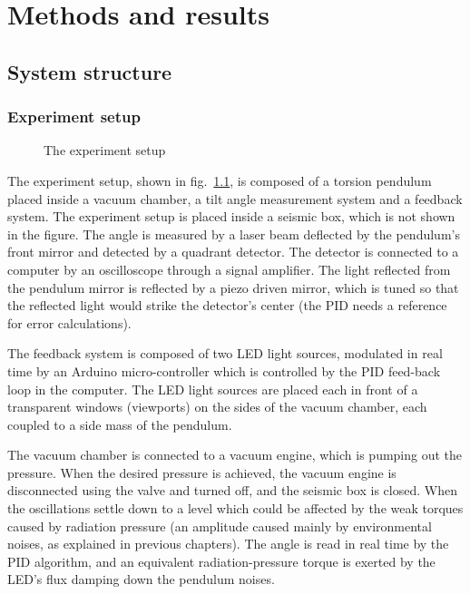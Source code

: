 \documentclass[\main/master.tex]{subfiles}
\begin{document}
\chapter{Methods and results}\label{chapter:Methods and results}

\section{System structure}
\subsection{Experiment setup}
\begin{figure}[htbp]
	\centering
	\caption[The experiment setup]{The experiment setup}
	\label{fig:setup}
\end{figure}
\FloatBarrier
\par\noindent
The experiment setup, shown in fig.~\ref{fig:setup}, is composed of a torsion pendulum placed inside a vacuum chamber, a tilt angle measurement system and a feedback system. The experiment setup is placed inside a seismic box, which is not shown in the figure. The angle is measured by a laser beam deflected by the pendulum's front mirror and detected by a quadrant detector. The detector is connected to a computer by an oscilloscope through a signal amplifier. The light reflected from the pendulum mirror is reflected by a piezo driven mirror, which is tuned so that the reflected light would strike the detector's center (the PID needs a reference for error calculations). 
\par\noindent
The feedback system is composed of two LED light sources, modulated in real time by an Arduino micro-controller which is controlled by the PID feed-back loop in the computer. The LED light sources are placed each in front of a transparent windows (viewports) on the sides of the vacuum chamber, each coupled to a side mass of the pendulum. 
\par\noindent
The vacuum chamber is connected to a vacuum engine, which is pumping out the pressure. When the desired pressure is achieved, the vacuum engine is disconnected using the valve and turned off, and the seismic box is closed. When the oscillations settle down to a level which could be affected by the weak torques caused by radiation pressure (an amplitude caused mainly by environmental noises, as explained in previous chapters). The angle is read in real time by the PID algorithm, and an equivalent radiation-pressure torque is exerted by the LED's flux damping down the pendulum noises.
\end{document}
